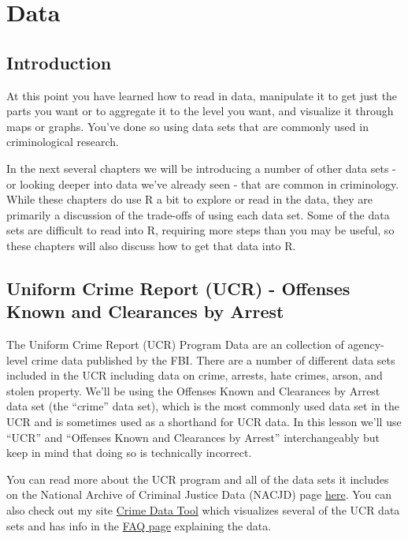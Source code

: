 \documentclass[
  12pt,
]{book}
\begin{document}
\hypertarget{part-data}{%
\part{Data}\label{part-data}}

\hypertarget{introduction}{%
\chapter{Introduction}\label{introduction}}

At this point you have learned how to read in data, manipulate it to get just the parts you want or to aggregate it to the level you want, and visualize it through maps or graphs. You've done so using data sets that are commonly used in criminological research.

In the next several chapters we will be introducing a number of other data sets - or looking deeper into data we've already seen - that are common in criminology. While these chapters do use R a bit to explore or read in the data, they are primarily a discussion of the trade-offs of using each data set. Some of the data sets are difficult to read into R, requiring more steps than you may be useful, so these chapters will also discuss how to get that data into R.

\hypertarget{ucr}{%
\chapter{Uniform Crime Report (UCR) - Offenses Known and Clearances by Arrest}\label{ucr}}

The Uniform Crime Report (UCR) Program Data are an collection of agency-level crime data published by the FBI. There are a number of different data sets included in the UCR including data on crime, arrests, hate crimes, arson, and stolen property. We'll be using the Offenses Known and Clearances by Arrest data set (the ``crime'' data set), which is the most commonly used data set in the UCR and is sometimes used as a shorthand for UCR data. In this lesson we'll use ``UCR'' and ``Offenses Known and Clearances by Arrest'' interchangeably but keep in mind that doing so is technically incorrect.

You can read more about the UCR program and all of the data sets it includes on the National Archive of Criminal Justice Data (NACJD) page \href{https://www.icpsr.umich.edu/icpsrweb/content/NACJD/guides/ucr.html}{here}. You can also check out my site \href{http://crimedatatool.com}{Crime Data Tool} which visualizes several of the UCR data sets and has info in the \href{http://crimedatatool.com/faq.html}{FAQ page} explaining the data.
\end{document}
